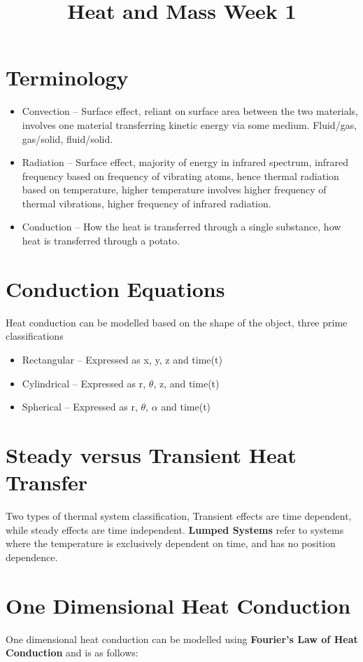 \documentclass[•]{article}
\begin{document}
\title{Heat and Mass Week 1}
\maketitle
\section*{Terminology}
\begin{itemize}
\item Convection – Surface effect, reliant on surface area between the two materials, involves one material transferring kinetic energy via some medium. Fluid/gas, gas/solid, fluid/solid.
\item Radiation – Surface effect, majority of energy in infrared spectrum, infrared frequency based on frequency of vibrating atoms, hence thermal radiation based on temperature, higher temperature involves higher frequency of thermal vibrations, higher frequency of infrared radiation.
\item Conduction – How the heat is transferred through a single substance, how heat is transferred through a potato.
\end{itemize}


\section*{Conduction Equations}
Heat conduction can be modelled based on the shape of the object, three prime classifications
\begin{itemize}
\item Rectangular – Expressed as x, y, z and time(t)
\item Cylindrical – Expressed as r, $\theta$, z, and time(t)
\item Spherical – Expressed as r, $\theta$, $\alpha$ and time(t)
\end{itemize}

\section*{Steady versus Transient Heat Transfer}
Two types of thermal system classification, Transient effects are time dependent, while steady effects are time independent. \textbf{Lumped Systems} refer to systems where the temperature is exclusively dependent on time, and has no position dependence.

\section*{One Dimensional Heat Conduction}
One dimensional heat conduction can be modelled using \textbf{Fourier's Law of Heat Conduction} and is as follows:
\end{document}
